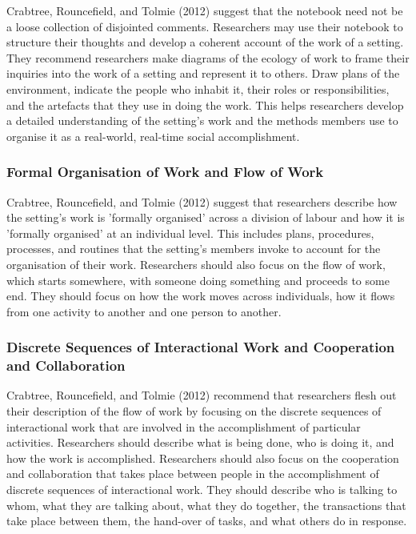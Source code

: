 \documentclass[
]{book}
\begin{document}
Crabtree, Rouncefield, and Tolmie (2012) suggest that the notebook need not be a loose collection of disjointed comments. Researchers may use their notebook to structure their thoughts and develop a coherent account of the work of a setting. They recommend researchers make diagrams of the ecology of work to frame their inquiries into the work of a setting and represent it to others. Draw plans of the environment, indicate the people who inhabit it, their roles or responsibilities, and the artefacts that they use in doing the work. This helps researchers develop a detailed understanding of the setting's work and the methods members use to organise it as a real-world, real-time social accomplishment.

\hypertarget{formal-organisation-of-work-and-flow-of-work}{%
\subsubsection{Formal Organisation of Work and Flow of Work}\label{formal-organisation-of-work-and-flow-of-work}}

Crabtree, Rouncefield, and Tolmie (2012) suggest that researchers describe how the setting's work is 'formally organised' across a division of labour and how it is 'formally organised' at an individual level. This includes plans, procedures, processes, and routines that the setting's members invoke to account for the organisation of their work. Researchers should also focus on the flow of work, which starts somewhere, with someone doing something and proceeds to some end. They should focus on how the work moves across individuals, how it flows from one activity to another and one person to another.

\hypertarget{discrete-sequences-of-interactional-work-and-cooperation-and-collaboration}{%
\subsubsection{Discrete Sequences of Interactional Work and Cooperation and Collaboration}\label{discrete-sequences-of-interactional-work-and-cooperation-and-collaboration}}

Crabtree, Rouncefield, and Tolmie (2012) recommend that researchers flesh out their description of the flow of work by focusing on the discrete sequences of interactional work that are involved in the accomplishment of particular activities. Researchers should describe what is being done, who is doing it, and how the work is accomplished. Researchers should also focus on the cooperation and collaboration that takes place between people in the accomplishment of discrete sequences of interactional work. They should describe who is talking to whom, what they are talking about, what they do together, the transactions that take place between them, the hand-over of tasks, and what others do in response.
\end{document}
